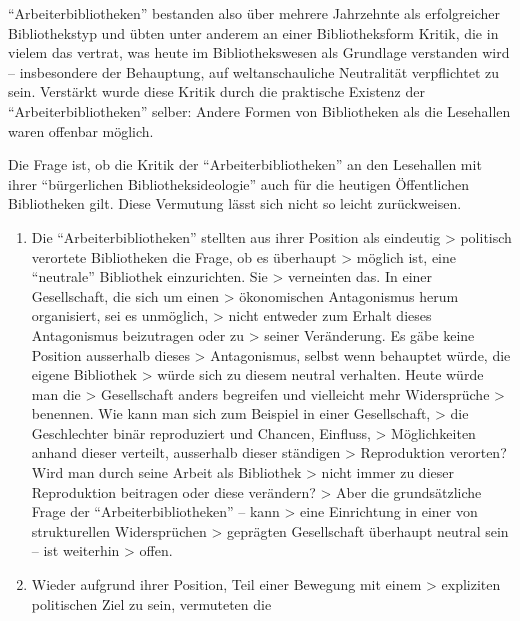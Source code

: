 \documentclass[a4paper,
fontsize=11pt,
oneside,
numbers=noperiodatend,
parskip=half-,
bibliography=totoc,
final
]{scrartcl}
\begin{document}
\enquote{Arbeiterbibliotheken} bestanden also über mehrere Jahrzehnte
als erfolgreicher Bibliothekstyp und übten unter anderem an einer
Bibliotheksform Kritik, die in vielem das vertrat, was heute im
Bibliothekswesen als Grundlage verstanden wird -- insbesondere der
Behauptung, auf weltanschauliche Neutralität verpflichtet zu sein.
Verstärkt wurde diese Kritik durch die praktische Existenz der
\enquote{Arbeiterbibliotheken} selber: Andere Formen von Bibliotheken
als die Lesehallen waren offenbar möglich.

Die Frage ist, ob die Kritik der \enquote{Arbeiterbibliotheken} an den
Lesehallen mit ihrer \enquote{bürgerlichen Bibliotheksideologie} auch
für die heutigen Öffentlichen Bibliotheken gilt. Diese Vermutung lässt
sich nicht so leicht zurückweisen.

\begin{enumerate}
\def\labelenumi{(\arabic{enumi})}
\item
  Die \enquote{Arbeiterbibliotheken} stellten aus ihrer Position als
  eindeutig \textgreater{} politisch verortete Bibliotheken die Frage,
  ob es überhaupt \textgreater{} möglich ist, eine \enquote{neutrale}
  Bibliothek einzurichten. Sie \textgreater{} verneinten das. In einer
  Gesellschaft, die sich um einen \textgreater{} ökonomischen
  Antagonismus herum organisiert, sei es unmöglich, \textgreater{} nicht
  entweder zum Erhalt dieses Antagonismus beizutragen oder zu
  \textgreater{} seiner Veränderung. Es gäbe keine Position ausserhalb
  dieses \textgreater{} Antagonismus, selbst wenn behauptet würde, die
  eigene Bibliothek \textgreater{} würde sich zu diesem neutral
  verhalten. Heute würde man die \textgreater{} Gesellschaft anders
  begreifen und vielleicht mehr Widersprüche \textgreater{} benennen.
  Wie kann man sich zum Beispiel in einer Gesellschaft, \textgreater{}
  die Geschlechter binär reproduziert und Chancen, Einfluss,
  \textgreater{} Möglichkeiten anhand dieser verteilt, ausserhalb dieser
  ständigen \textgreater{} Reproduktion verorten? Wird man durch seine
  Arbeit als Bibliothek \textgreater{} nicht immer zu dieser
  Reproduktion beitragen oder diese verändern? \textgreater{} Aber die
  grundsätzliche Frage der \enquote{Arbeiterbibliotheken} -- kann
  \textgreater{} eine Einrichtung in einer von strukturellen
  Widersprüchen \textgreater{} geprägten Gesellschaft überhaupt neutral
  sein -- ist weiterhin \textgreater{} offen.
\item
  Wieder aufgrund ihrer Position, Teil einer Bewegung mit einem
  \textgreater{} expliziten politischen Ziel zu sein, vermuteten die

\end{enumerate}
\end{document}
